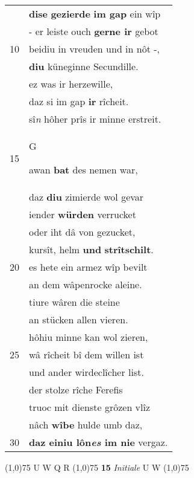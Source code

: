 \documentclass[8pt,a4paper,notitlepage]{article}
\begin{document}
\begin{table}[ht]
\begin{minipage}[t]{0.5\linewidth}
\begin{tabular}{rl}
 & \textbf{dise} \textbf{gezierde} \textbf{im gap} ein wîp\\ 
 & - er leiste ouch \textbf{gerne ir} gebot\\ 
10 & beidiu in vreuden und in nôt -,\\ 
 & \textbf{diu} küneginne Secundille.\\ 
 & ez was ir herzewille,\\ 
 & daz si im gap \textbf{ir} rîcheit.\\ 
 & sî\textit{n} hôher prîs ir minne erstreit.\\ 
15 & \begin{large}G\end{large}awan \textbf{bat} des nemen war,\\ 
 & daz \textbf{diu} zimierde wol gevar\\ 
 & iender \textbf{würden} verrucket\\ 
 & oder iht dâ von gezucket,\\ 
 & kursît, helm \textbf{und} \textbf{strîtschilt}.\\ 
20 & es hete ein armez wîp bevilt\\ 
 & an dem wâpenrocke aleine.\\ 
 & tiure wâren die steine\\ 
 & an stücken allen vieren.\\ 
 & hôhiu minne kan wol zieren,\\ 
25 & wâ rîcheit bî dem willen ist\\ 
 & und ander wirdeclîcher list.\\ 
 & der stolze rîche Ferefis\\ 
 & truoc mit dienste grôzen vlîz\\ 
 & nâch \textbf{wîbe} hulde umb daz,\\ 
30 & \textbf{daz einiu lôn\textit{es} im nie} vergaz.\\ 
\end{tabular}
\scriptsize
\line(1,0){75} \newline
U W Q R \newline
\line(1,0){75} \newline
\textbf{15} \textit{Initiale} U W  \newline
\line(1,0){75} \newline

\end{minipage}
\end{table}
\end{document}

